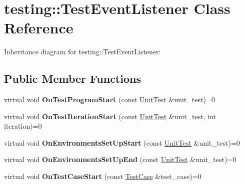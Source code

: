 \hypertarget{classtesting_1_1TestEventListener}{}\section{testing\+:\+:Test\+Event\+Listener Class Reference}
\label{classtesting_1_1TestEventListener}


Inheritance diagram for testing\+:\+:Test\+Event\+Listener\+:
\subsection*{Public Member Functions}
\begin{DoxyCompactItemize}
\item 
\mbox{\label{classtesting_1_1TestEventListener_a5f6c84f39851e8a603a2d2e10063816b}} 
virtual void {\bfseries On\+Test\+Program\+Start} (const \hyperlink{classtesting_1_1UnitTest}{Unit\+Test} \&unit\+\_\+test)=0
\item 
\mbox{\label{classtesting_1_1TestEventListener_a60cc09b7907cb329d152eb5e7133bdeb}} 
virtual void {\bfseries On\+Test\+Iteration\+Start} (const \hyperlink{classtesting_1_1UnitTest}{Unit\+Test} \&unit\+\_\+test, int iteration)=0
\item 
\mbox{\label{classtesting_1_1TestEventListener_aa6502e534919605be45f26a6daf9a40c}} 
virtual void {\bfseries On\+Environments\+Set\+Up\+Start} (const \hyperlink{classtesting_1_1UnitTest}{Unit\+Test} \&unit\+\_\+test)=0
\item 
\mbox{\label{classtesting_1_1TestEventListener_aaa1021d75f5dbf3f05c829c1cc520341}} 
virtual void {\bfseries On\+Environments\+Set\+Up\+End} (const \hyperlink{classtesting_1_1UnitTest}{Unit\+Test} \&unit\+\_\+test)=0
\item 
\mbox{\label{classtesting_1_1TestEventListener_ab4ed885d63f5bbff8076c1329b3dfe36}} 
virtual void {\bfseries On\+Test\+Case\+Start} (const \hyperlink{classtesting_1_1TestCase}{Test\+Case} \&test\+\_\+case)=0
\item 
\mbox{\label{classtesting_1_1TestEventListener_ab4f6a0ca16ae75daf385b3b5914e1048}} 

\end{DoxyCompactItemize}

